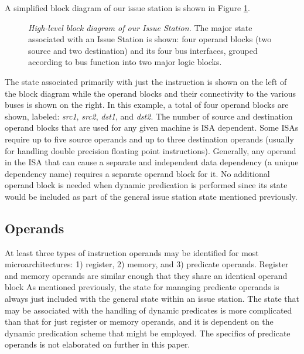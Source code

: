 \documentclass[10pt,dvips]{article}
\begin{document}
A simplified block diagram of our issue station is shown in 
Figure \ref{fig:issuestation}.
%
\begin{figure}
\centering
{}
\caption{{\em High-level block diagram of our Issue Station.} 
The major state associated with an Issue Station is shown:
four operand blocks (two source and two destination)
and its four bus interfaces, grouped
according to bus function into two major logic blocks.}
\label{fig:issuestation}
\end{figure}
%
The state associated primarily with just the instruction is
shown on the left of the block diagram while the operand blocks
and their connectivity to the various buses is shown on the
right.  
In this example, a total of four operand blocks are shown, labeled:
\textit{src1}, 
\textit{src2}, 
\textit{dst1}, 
and \textit{dst2}.
The number of source and destination operand blocks that are
used for any given machine is ISA dependent.
Some ISAs require up to five source operands and up to three destination
operands (usually for handling double precision floating point 
instructions).
Generally, any operand in the ISA that can cause a separate
and independent data dependency (a unique dependency name)
requires a separate operand block for it.
No additional operand block is needed when dynamic predication
is performed since its state would be included as
part of the general issue station state mentioned previously.
%
%
\subsection{Operands}
%
At least three types of instruction operands may be identified
for most microarchitectures: 
1) register, 2) memory, and 3) predicate operands.
Register and memory operands are similar enough that
they share an identical operand block
As mentioned previously, the state for managing predicate
operands is always just included with the general state within
an issue station.
The state that may be associated with the handling of
dynamic predicates is more complicated than that for
just register or memory operands, and it is dependent
on the dynamic predication scheme that might be employed.
The specifics of predicate operands is not elaborated on
further in this paper.
\end{document}
